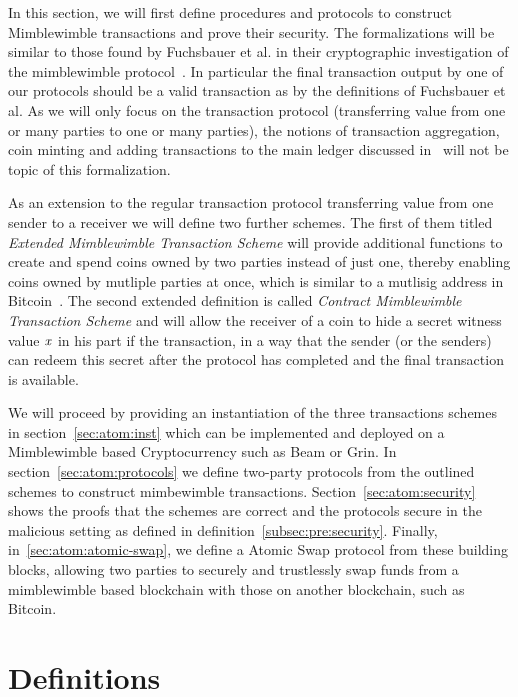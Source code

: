In this section, we will first define procedures and protocols to construct Mimblewimble transactions and prove their security.
The formalizations will be similar to those found by Fuchsbauer et al. in their cryptographic investigation of the mimblewimble protocol~\cite{fuchsbauer2019aggregate}.
In particular the final transaction output by one of our protocols should be a valid transaction as by the definitions of Fuchsbauer et al.
As we will only focus on the transaction protocol (transferring value from one or many parties to one or many parties), the notions of transaction aggregation, coin minting and adding transactions to the main ledger discussed in~\cite{fuchsbauer2019aggregate} will not be topic of this formalization.

As an extension to the regular transaction protocol transferring value from one sender to a receiver we will define two further schemes.
The first of them titled \emph{Extended Mimblewimble Transaction Scheme} will provide additional functions to create and spend coins owned by two parties instead of just one, thereby enabling coins owned by mutliple parties at once, which is similar to a mutlisig address in Bitcoin~\cite{antonopoulos2014mastering}.
The second extended definition is called \emph{Contract Mimblewimble Transaction Scheme} and will allow the receiver
of a coin to hide a secret witness value $\mathit{x}$ in his part if the transaction, in a way that the sender (or the senders) can redeem this secret after the protocol has completed and the final transaction is available.

We will proceed by providing an instantiation of the three transactions schemes in section~\ref{sec:atom:inst} which can be implemented and deployed on a Mimblewimble based Cryptocurrency such as Beam or Grin.
In section~\ref{sec:atom:protocols} we define two-party protocols from the outlined schemes to construct mimbewimble transactions.
Section~\ref{sec:atom:security} shows the proofs that the schemes are correct and the protocols secure in the malicious setting as defined in definition~\ref{subsec:pre:security}.
Finally, in~\ref{sec:atom:atomic-swap}, we define a Atomic Swap protocol from these building blocks, allowing two parties to securely and trustlessly swap funds from a mimblewimble based blockchain with those on another blockchain, such as Bitcoin.

\section{Definitions}\label{sec:atom:definitions}


